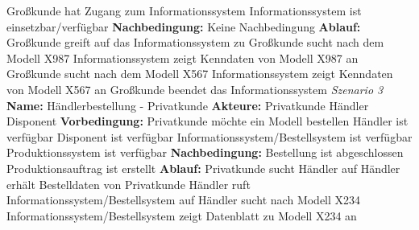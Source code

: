 \documentclass{swp1}
\begin{document}
Großkunde hat Zugang zum Informationssystem\newline
Informationssystem ist einsetzbar/verfügbar\newline
\textbf{Nachbedingung:}\newline
Keine Nachbedingung\newline
\textbf{Ablauf:}\newline
Großkunde greift auf das Informationssystem zu\newline
Großkunde sucht nach dem Modell X987\newline
Informationssystem zeigt Kenndaten von Modell X987 an\newline
Großkunde sucht nach dem Modell X567\newline
Informationssystem zeigt Kenndaten von Modell X567 an\newline
Großkunde beendet das Informationssystem\newline
\newline
\emph{Szenario 3}\newline
\textbf{Name:}\newline
Händlerbestellung - Privatkunde\newline
\textbf{Akteure:}\newline
Privatkunde\newline
Händler\newline
Disponent\newline
\textbf{Vorbedingung:}\newline
Privatkunde möchte ein Modell bestellen\newline
Händler ist verfügbar\newline
Disponent ist verfügbar\newline
Informationssystem/Bestellsystem ist verfügbar\newline
Produktionssystem ist verfügbar\newline
\textbf{Nachbedingung:}\newline
Bestellung ist abgeschlossen\newline
Produktionsauftrag ist erstellt\newline
\textbf{Ablauf:}\newline
Privatkunde sucht Händler auf\newline
Händler erhält Bestelldaten von Privatkunde\newline
Händler ruft Informationssystem/Bestellsystem auf\newline
Händler sucht nach Modell X234\newline
Informationssystem/Bestellsystem zeigt Datenblatt zu Modell X234 an\newline
\end{document}
